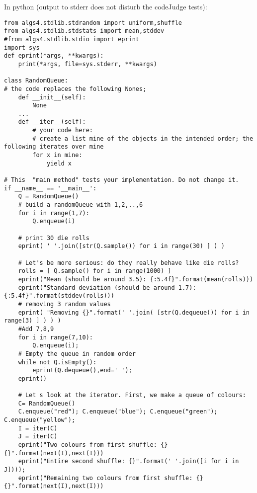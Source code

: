 \documentclass{tufte-handout}
\begin{document}
In python (output to stderr does not disturb the codeJudge tests):
\begin{verbatim}
from algs4.stdlib.stdrandom import uniform,shuffle
from algs4.stdlib.stdstats import mean,stddev
#from algs4.stdlib.stdio import eprint
import sys
def eprint(*args, **kwargs):
    print(*args, file=sys.stderr, **kwargs)

class RandomQueue:
# the code replaces the following Nones; 
    def __init__(self):
        None
    ...
    def __iter__(self):
        # your code here:
        # create a list mine of the objects in the intended order; the following iterates over mine
        for x in mine:
            yield x

# This  "main method" tests your implementation. Do not change it.
if __name__ == '__main__':
    Q = RandomQueue()
    # build a randomQueue with 1,2,..,6
    for i in range(1,7):
        Q.enqueue(i)
        
    # print 30 die rolls
    eprint( ' '.join([str(Q.sample()) for i in range(30) ] ) )

    # Let's be more serious: do they really behave like die rolls?
    rolls = [ Q.sample() for i in range(1000) ]
    eprint("Mean (should be around 3.5): {:5.4f}".format(mean(rolls)))
    eprint("Standard deviation (should be around 1.7): {:5.4f}".format(stddev(rolls)))
    # removing 3 random values
    eprint( "Removing {}".format(' '.join( [str(Q.dequeue()) for i in range(3) ] ) ) )    
    #Add 7,8,9
    for i in range(7,10):
        Q.enqueue(i); 
    # Empty the queue in random order
    while not Q.isEmpty():
        eprint(Q.dequeue(),end=' ');
    eprint()

    # Let s look at the iterator. First, we make a queue of colours:
    C= RandomQueue()
    C.enqueue("red"); C.enqueue("blue"); C.enqueue("green"); C.enqueue("yellow"); 
    I = iter(C)
    J = iter(C)
    eprint("Two colours from first shuffle: {} {}".format(next(I),next(I)))
    eprint("Entire second shuffle: {}".format(' '.join([i for i in J])));
    eprint("Remaining two colours from first shuffle: {} {}".format(next(I),next(I)))
\end{verbatim}
\end{document}
